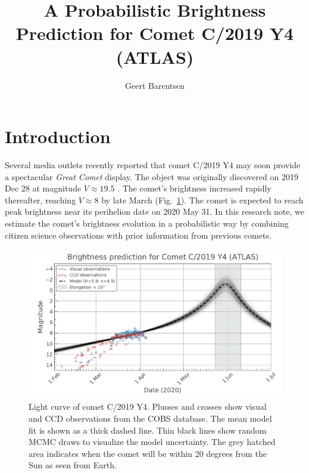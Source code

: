\documentclass[RNAAS]{aastex63}
\begin{document}
\title{A Probabilistic Brightness Prediction for Comet C/2019 Y4 (ATLAS)}



\author[0000-0002-3306-3484]{Geert Barentsen}



\section{Introduction} \label{sec:intro}

Several media outlets recently reported that comet C/2019 Y4 may soon provide a spectacular \textit{Great Comet} display.
The object was originally discovered on 2019 Dec 28 at magnitude $V\approx19.5$ \citep{CBET4712}. The comet's brightness increased rapidly thereafter, reaching $V\approx8$ by late March (Fig.~\ref{fig:1}). 
The comet is expected to reach peak brightness near its perihelion date on 2020 May 31.
In this research note, we estimate the comet's brightness evolution in a probabilistic way by combining citizen science observations with prior information from previous comets.

\begin{figure}[h!]
\begin{center}
\includegraphics[scale=0.85,angle=0]{2019y4-prediction.pdf}
\caption{Light curve of comet C/2019 Y4. Plusses and crosses show visual and CCD observations from the COBS database. The mean model fit is shown as a thick dashed line. Thin black lines show random MCMC draws to visualize the model uncertainty. The grey hatched area indicates when the comet will be within 20 degrees from the Sun as seen from Earth.\label{fig:1}}
\end{center}
\end{figure}
\end{document}
